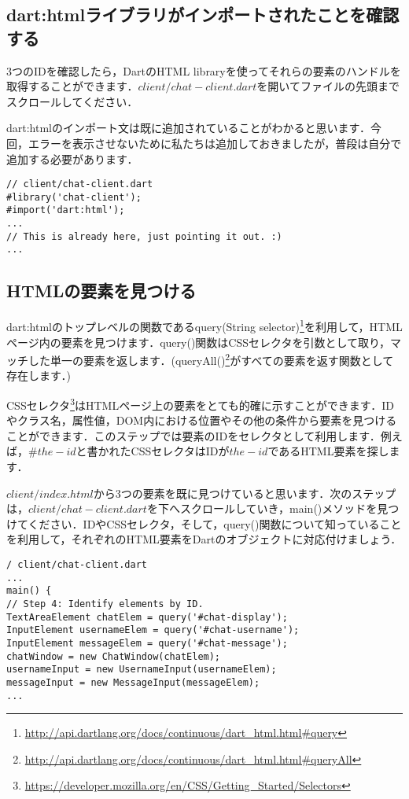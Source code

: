 \subsection{dart:htmlライブラリがインポートされたことを確認する}

3つのIDを確認したら，DartのHTML libraryを使ってそれらの要素のハンドルを取得することができます．$ client/chat-client.dart $を開いてファイルの先頭までスクロールしてください．

dart:htmlのインポート文は既に追加されていることがわかると思います．今回，エラーを表示させないために私たちは追加しておきましたが，普段は自分で追加する必要があります．

\begin{verbatim}
// client/chat-client.dart
#library('chat-client');
#import('dart:html');
...
// This is already here, just pointing it out. :)
...
\end{verbatim}

\subsection{HTMLの要素を見つける}

dart:htmlのトップレベルの関数であるquery(String selector)\footnote{\url{http://api.dartlang.org/docs/continuous/dart\_html.html\#query}}を利用して，HTMLページ内の要素を見つけます．query()関数はCSSセレクタを引数として取り，マッチした単一の要素を返します．(queryAll()\footnote{\url{http://api.dartlang.org/docs/continuous/dart\_html.html\#queryAll}}がすべての要素を返す関数として存在します．)

CSSセレクタ\footnote{\url{https://developer.mozilla.org/en/CSS/Getting\_Started/Selectors}}はHTMLページ上の要素をとても的確に示すことができます．IDやクラス名，属性値，DOM内における位置やその他の条件から要素を見つけることができます．このステップでは要素のIDをセレクタとして利用します．例えば，$ \#the-id $と書かれたCSSセレクタはIDが$ the-id $であるHTML要素を探します．

$ client/index.html $から3つの要素を既に見つけていると思います．次のステップは，$ client/chat-client.dart $を下へスクロールしていき，main()メソッドを見つけてください．IDやCSSセレクタ，そして，query()関数について知っていることを利用して，それぞれのHTML要素をDartのオブジェクトに対応付けましょう．

\begin{verbatim}
/ client/chat-client.dart
...
main() {
// Step 4: Identify elements by ID.
TextAreaElement chatElem = query('#chat-display');
InputElement usernameElem = query('#chat-username');
InputElement messageElem = query('#chat-message');
chatWindow = new ChatWindow(chatElem);
usernameInput = new UsernameInput(usernameElem);
messageInput = new MessageInput(messageElem);
...
\end{verbatim}

